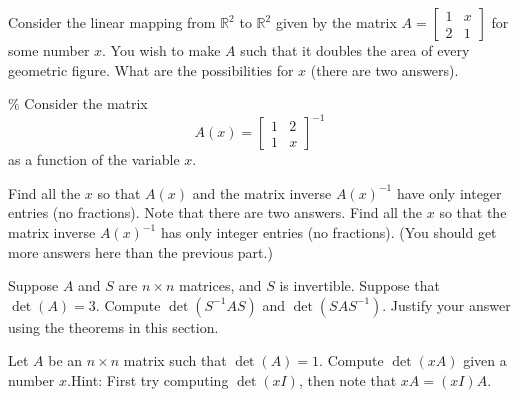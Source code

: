 \documentclass{ximera}
\begin{document}
\begin{exercise}
    Consider the linear mapping from ${\mathbb R}^2$ to ${\mathbb R}^2$ given by the  matrix
    $A = \left[ \begin{smallmatrix}
        1 & x \\
        2 & 1
    \end{smallmatrix} \right]$
    for some number $x$.  You wish to make $A$ such that it doubles the area of every geometric figure.  What are the possibilities for $x$ (there are two answers).
\end{exercise}

\begin{exercise}[challenging]\%
    Consider the matrix
    \begin{equation*}
        A(x) = \begin{bmatrix}
            1 & 2 \\ 
            1 & x
        \end{bmatrix}^{-1}
    \end{equation*}
    as a function of the variable $x$.
    \begin{tasks}
        \task Find all the $x$ so that $A(x)$ and the matrix inverse $A(x)^{-1}$ have only integer entries (no fractions). Note that there are two answers.
        \task Find all the $x$ so that the matrix inverse $A(x)^{-1}$ has only integer entries (no fractions). (You should get more answers here than the previous part.)
    \end{tasks}
\end{exercise}

\begin{exercise}
    Suppose $A$ and $S$ are $n \times n$ matrices, and $S$ is invertible. Suppose that $\det(A) = 3$.  Compute $\det(S^{-1}AS)$ and $\det(SAS^{-1})$.  Justify your answer using the theorems in this section.
\end{exercise}

\begin{exercise}
    Let $A$ be an $n \times n$ matrix such that $\det(A)=1$. Compute $\det(x A)$ given a number $x$.\linebreak[2] Hint: First try computing $\det(xI)$, then note that $xA = (xI)A$.
\end{exercise}
%
\end{document}
